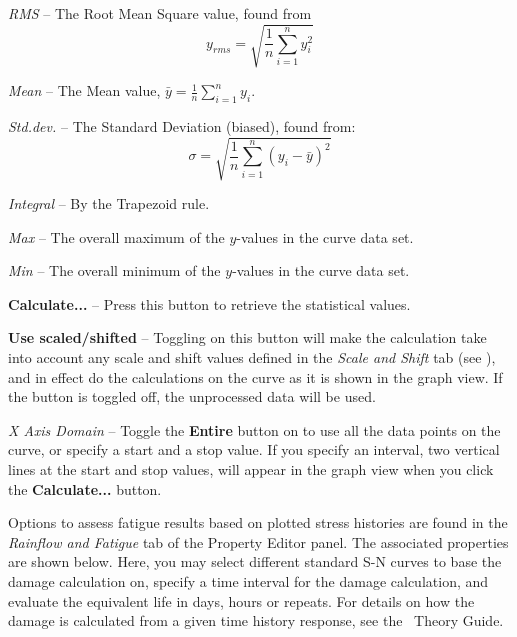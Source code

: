 \begin{bulletlist}
\item{\sl RMS} --
  The Root Mean Square value, found from
  $$
    y_{rms} = \sqrt{\frac{1}{n}\sum_{i=1}^n y_i^2}
  $$

\item{\sl Mean} --
  The Mean value, $\bar{y}=\frac{1}{n}\sum_{i=1}^n y_i$.

\item{\sl Std.dev.} --
  The Standard Deviation (biased), found from:
  $$
    \sigma = \sqrt{\frac{1}{n}\sum_{i=1}^n ({y_i}-{\bar{y}})^2}
  $$

\item{\sl Integral} --
  By the Trapezoid rule.

\item{\sl Max} --
  The overall maximum of the $y$-values in the curve data set.

\item{\sl Min} --
  The overall minimum of the $y$-values in the curve data set.

\item\textbf{Calculate...} --
  Press this button to retrieve the statistical values.

\item\textbf{Use scaled/shifted} --
  Toggling on this button will make the calculation take into account any scale
  and shift values defined in the {\sl Scale and Shift} tab
  (see ), and in effect
  do the calculations on the curve as it is shown in the graph view.
  If the button is toggled off, the unprocessed data will be used.

\item{\sl X Axis Domain} --
  Toggle the \textbf{Entire} button on to use all the data points on the curve,
  or specify a start and a stop value. If you specify an interval,
  two vertical lines at the start and stop values, will appear in the graph view
  when you click the \textbf{Calculate...} button.
\end{bulletlist}



Options to assess fatigue results based on plotted stress histories are found
in the {\sl Rainflow and Fatigue} tab of the Property Editor panel.
The associated properties are shown below. Here, you may select different
standard S-N curves to base the damage calculation on, specify a time interval
for the damage calculation, and evaluate the equivalent life in days, hours or
repeats. For details on how the damage is calculated from a given time history
response, see the \FedemVer~Theory Guide.

